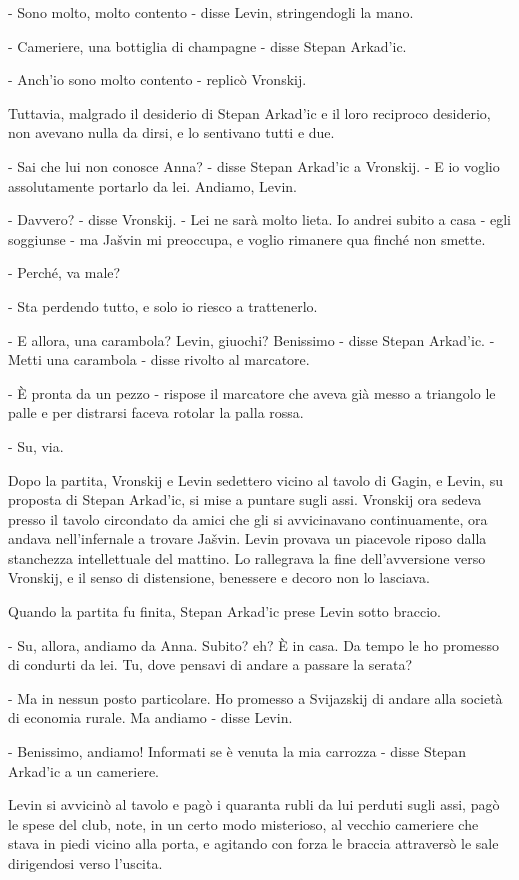 - Sono molto, molto contento - disse Levin, stringendogli la mano. 

- Cameriere, una bottiglia di champagne - disse Stepan Arkad'ic. 

- Anch'io sono molto contento - replicò Vronskij. 

Tuttavia, malgrado il desiderio di Stepan Arkad'ic e il loro reciproco desiderio, non avevano nulla da dirsi, e lo sentivano tutti e due. 

- Sai che lui non conosce Anna? - disse Stepan Arkad'ic a Vronskij. - E io voglio assolutamente portarlo da lei. Andiamo, Levin. 

- Davvero? - disse Vronskij. - Lei ne sarà molto lieta. Io andrei subito a casa - egli soggiunse - ma Jašvin mi preoccupa, e voglio rimanere qua finché non smette. 

- Perché, va male? 

- Sta perdendo tutto, e solo io riesco a trattenerlo. 

- E allora, una carambola? Levin, giuochi? Benissimo - disse Stepan Arkad'ic. - Metti una carambola - disse rivolto al marcatore. 

- È pronta da un pezzo - rispose il marcatore che aveva già messo a triangolo le palle e per distrarsi faceva rotolar la palla rossa. 

- Su, via. 

Dopo la partita, Vronskij e Levin sedettero vicino al tavolo di Gagin, e Levin, su proposta di Stepan Arkad'ic, si mise a puntare sugli assi. Vronskij ora sedeva presso il tavolo circondato da amici che gli si avvicinavano continuamente, ora andava nell'infernale a trovare Jašvin. Levin provava un piacevole riposo dalla stanchezza intellettuale del mattino. Lo rallegrava la fine dell'avversione verso Vronskij, e il senso di distensione, benessere e decoro non lo lasciava. 

Quando la partita fu finita, Stepan Arkad'ic prese Levin sotto braccio. 

- Su, allora, andiamo da Anna. Subito? eh? È in casa. Da tempo le ho promesso di condurti da lei. Tu, dove pensavi di andare a passare la serata? 

- Ma in nessun posto particolare. Ho promesso a Svijazskij di andare alla società di economia rurale. Ma andiamo - disse Levin. 

- Benissimo, andiamo! Informati se è venuta la mia carrozza - disse Stepan Arkad'ic a un cameriere. 

Levin si avvicinò al tavolo e pagò i quaranta rubli da lui perduti sugli assi, pagò le spese del club, note, in un certo modo misterioso, al vecchio cameriere che stava in piedi vicino alla porta, e agitando con forza le braccia attraversò le sale dirigendosi verso l'uscita. 

